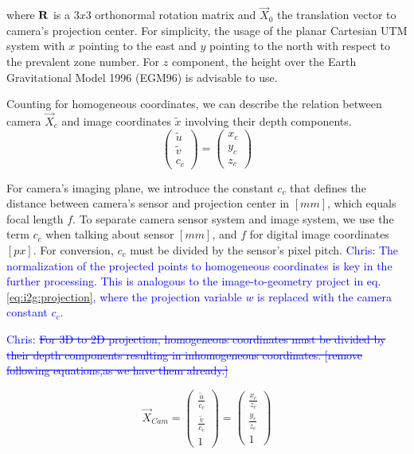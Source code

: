 \documentclass[review]{elsarticle}
\begin{document}
where $\bf R$ is a $3x3$ orthonormal rotation matrix and $\vec{X}_0 $ the translation vector to camera's projection center. For simplicity, the usage of the planar Cartesian UTM system with $x$ pointing to the east and $y$ pointing to the north with respect to the prevalent zone number. For $z$ component, the height over the Earth Gravitational Model 1996 (EGM96) is advisable to use. 

Counting for homogeneous coordinates, we can describe the relation between camera $\vec{X}_c$ and image coordinates $\tilde{x}$ involving their depth components. 
\begin{equation}
\begin{pmatrix}
\tilde{u} \\
\tilde{v} \\
c_c
\end{pmatrix} =
\begin{pmatrix}
x_c \\
y_c \\
z_c
\end{pmatrix}
\end{equation}

For camera's imaging plane, we introduce the constant $c_c$ that defines the distance between camera's sensor and projection center in $[mm]$, which equals focal length $f$. To separate camera sensor system and image system, we use the term $c_c$ when talking about sensor $[mm]$, and $f$ for digital image coordinates $[px]$. For conversion, $c_c$ must be divided by the sensor's pixel pitch. \textcolor{blue}{Chris: The normalization of the projected points to homogeneous coordinates is key in the further processing. This is analogous to the image-to-geometry project in eq. \ref{eq:i2g:projection}, where the projection variable $w$ is replaced with the camera constant $c_c$.}

\textcolor{blue}{Chris:
\sout{For 3D to 2D projection, homogeneous coordinates must be divided by their depth components resulting in inhomogeneous coordinates. [remove following equations,as we have them already.]}
}

\begin{equation}
\vec{X}_{Cam} =
\begin{pmatrix}
\frac{\tilde{u}}{c_c} \\
\frac{\tilde{v}}{c_c} \\
1
\end{pmatrix} = \begin{pmatrix}
\frac{x_c}{z_c} \\
\frac{y_c}{z_c} \\
1
\end{pmatrix}
\end{equation}
\end{document}
